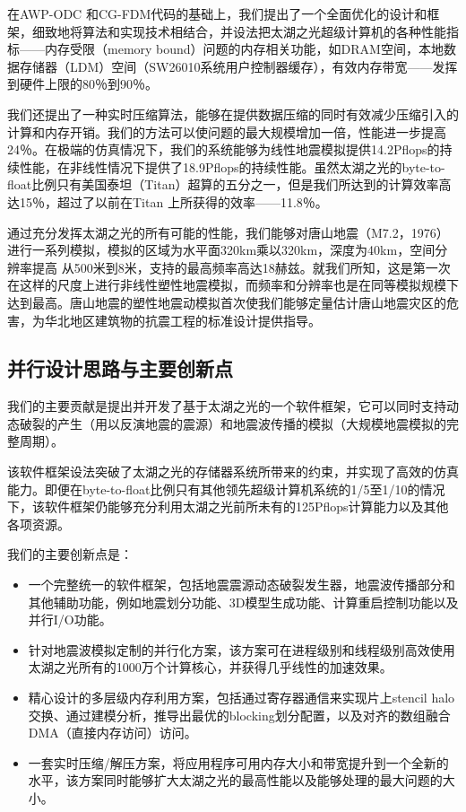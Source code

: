 \documentclass[degree=doctor]{thuthesis}
\begin{document}
在AWP-ODC \citep{cui2010scalable}和CG-FDM\citep{zhang2014three}代码的基础上，我们提出了一个全面优化的设计和框架，细致地将算法和实现技术相结合，并设法把太湖之光超级计算机的各种性能指标——内存受限（memory bound）问题的内存相关功能，如DRAM空间，本地数据存储器（LDM）空间（SW26010系统用户控制器缓存），有效内存带宽——发挥到硬件上限的80％到90％。

我们还提出了一种实时压缩算法，能够在提供数据压缩的同时有效减少压缩引入的计算和内存开销。我们的方法可以使问题的最大规模增加一倍，性能进一步提高24％。在极端的仿真情况下，我们的系统能够为线性地震模拟提供14.2Pflops的持续性能，在非线性情况下提供了18.9Pflops的持续性能。虽然太湖之光的byte-to-float比例只有美国泰坦（Titan）超算的五分之一，但是我们所达到的计算效率高达15％，超过了以前在Titan \citep{roten2016high}上所获得的效率——11.8％。

通过充分发挥太湖之光的所有可能的性能，我们能够对唐山地震（M7.2，1976）进行一系列模拟，模拟的区域为水平面320km乘以320km，深度为40km，空间分辨率提高 从500米到8米，支持的最高频率高达18赫兹。就我们所知，这是第一次在这样的尺度上进行非线性塑性地震模拟，而频率和分辨率也是在同等模拟规模下达到最高。唐山地震的塑性地震动模拟首次使我们能够定量估计唐山地震灾区的危害，为华北地区建筑物的抗震工程的标准设计提供指导。

\subsection{并行设计思路与主要创新点}

我们的主要贡献是提出并开发了基于太湖之光的一个软件框架，它可以同时支持动态破裂的产生（用以反演地震的震源）和地震波传播的模拟（大规模地震模拟的完整周期）。

该软件框架设法突破了太湖之光的存储器系统所带来的约束，并实现了高效的仿真能力。即便在byte-to-float比例只有其他领先超级计算机系统的1/5至1/10的情况下，该软件框架仍能够充分利用太湖之光前所未有的125Pflops计算能力以及其他各项资源。

我们的主要创新点是：

\begin{itemize}
\item 一个完整统一的软件框架，包括地震震源动态破裂发生器，地震波传播部分和其他辅助功能，例如地震划分功能、3D模型生成功能、计算重启控制功能以及并行I/O功能。

\item 针对地震波模拟定制的并行化方案，该方案可在进程级别和线程级别高效使用太湖之光所有的1000万个计算核心，并获得几乎线性的加速效果。

\item 精心设计的多层级内存利用方案，包括通过寄存器通信来实现片上stencil halo交换、通过建模分析，推导出最优的blocking划分配置，以及对齐的数组融合DMA（直接内存访问）访问。

\item 一套实时压缩/解压方案，将应用程序可用内存大小和带宽提升到一个全新的水平，该方案同时能够扩大太湖之光的最高性能以及能够处理的最大问题的大小。
\end{itemize}
\end{document}
